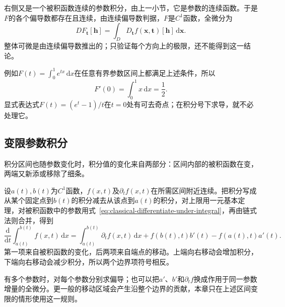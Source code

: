 右侧又是一个被积函数连续的参数积分，由上一小节，它是参数的连续函数。于是$F$的各个偏导数都存在且连续，由连续偏导数判据，$F$是$C^1$函数，全微分为
\[
 DF_{\bm t}[\bm h]=\int_D D_{\bm t}f(\bm x,\bm t)[\bm h]\,\mathrm d\bm x.
\]
整体可微是由连续偏导数推出的；只验证每个方向上的极限，还不能得到这一结论。

例如$F(t)=\int_0^1 e^{tx}\,\mathrm dx$在任意有界参数区间上都满足上述条件，所以
\[
 F'(0)=\int_0^1x\,\mathrm dx=\frac12.
\]
显式表达式$F(t)=(e^t-1)/t$在$t=0$处有可去奇点；在积分号下求导，就不必处理它。

\subsection{变限参数积分}

积分区间也随参数变化时，积分值的变化来自两部分：区间内部的被积函数在变，两端又新添或移除了细条。

设$a(t),b(t)$为$C^1$函数，$f(x,t)$及$\partial_tf(x,t)$在所需区间附近连续。把积分写成从某个固定点到$b(t)$的积分减去从该点到$a(t)$的积分，对上限用一元基本定理，对被积函数中的参数用式~\eqref{eq:classical-differentiate-under-integral}，再由链式法则合并，得到
\begin{equation}
 \frac{\mathrm d}{\mathrm dt}\int_{a(t)}^{b(t)}f(x,t)\,\mathrm dx
 =\int_{a(t)}^{b(t)}\partial_tf(x,t)\,\mathrm dx
 +f(b(t),t)b'(t)-f(a(t),t)a'(t).
\label{eq:classical-variable-limit-derivative}
\end{equation}
第一项来自被积函数的变化，后两项来自端点的移动。上端向右移动会增加积分，下端向右移动会减少积分，所以两个边界项符号相反。

有多个参数时，对每个参数分别求偏导；也可以把$a'$、$b'$和$\partial_tf$换成作用于同一参数增量的全微分。更一般的移动区域会产生沿整个边界的贡献，本章只在上述区间变限的情形使用这一规则。
